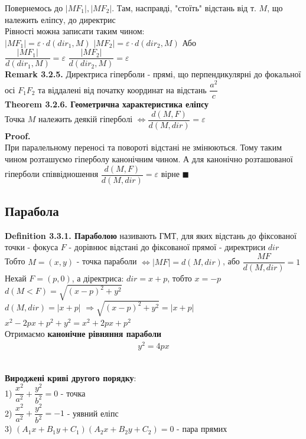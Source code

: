 \documentclass[a4paper, 14pt]{extarticle}
\def\defin#1{\textbf{Definition {#1}}}
\def\rm#1{\textbf{Remark {#1}}}
\def\th#1{\textbf{Theorem {#1}}}
\def\proof{\textbf{Proof.}\\}
\def\bigline{\vspace{5mm}\\}
\def\qed{$\blacksquare$}
\begin{document}
Повернемось до $|MF_1|,|MF_2|$. Там, насправді, "стоїть" \textrm{} відстань від т. $M$, що належить еліпсу, до директрис\\
Рівності можна записати таким чином:\\
$|MF_1| = \varepsilon \cdot d(dir_1, M)$ \hspace{0.5cm} $|MF_2| = \varepsilon \cdot d(dir_2, M)$
Або\\
$\dfrac{|MF_1|}{d(dir_1, M)} = \varepsilon$ \hspace{0.5cm} $\dfrac{|MF_2|}{d(dir_2, M)} = \varepsilon$
\bigline
\rm{3.2.5.} Директриса гіперболи - прямі, що перпендикулярні до фокальної осі $F_1F_2$ та віддалені від початку координат на відстань $\dfrac{a^2}{c}$
\bigline
\th{3.2.6. Геометрична характеристика еліпсу}\\
Точка $M$ належить деякій гіперболі $\iff \dfrac{d(M,F)}{d(M,dir)} = \varepsilon$\\
\proof
При паралельному переносі та повороті відстані не змінюються. Тому таким чином розташуємо гіперболу канонічним чином. А для канонічно розташованої гіперболи співвідношення $\dfrac{d(M,F)}{d(M,dir)} = \varepsilon$ вірне \qed
\bigline
\subsection{Парабола}
\defin{3.3.1. Параболою} називають ГМТ, для яких відстань до фіксованої точки - фокуса $F$ - дорівнює відстані до фіксованої прямої - директриси $dir$\\
Тобто $M=(x,y)$ - точка параболи $\iff |MF|=d(M,dir)$, або $\dfrac{MF}{d(M,dir)}=1$
\bigline
Нехай $F = (p,0)$, а діректриса: $dir = x + p$, тобто $x = -p$\\
$d(M<F)=\sqrt{(x-p)^2+y^2}$\\
$d(M,dir)=|x+p|$
$\Rightarrow \sqrt{(x-p)^2+y^2}=|x+p|$\\
$x^2-2px+p^2+y^2=x^2+2px+p^2$\\
Отримаємо \textbf{канонічне рівняння параболи}
\begin{align*}
y^2 = 4px
\end{align*}
\bigline
\textbf{Вироджені криві другого порядку}:\\
1) $\dfrac{x^2}{a^2} + \dfrac{y^2}{b^2} = 0$ - точка\\
2) $\dfrac{x^2}{a^2} + \dfrac{y^2}{b^2} = -1$ - уявний еліпс\\
3) $(A_1 x + B_1 y + C_1)(A_2 x + B_2 y + C_2) = 0$ - пара прямих\\
\end{document}
